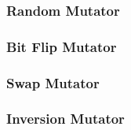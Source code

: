   \subsubsection{Random Mutator}
  \label{sec:keen:operators:mutation:simple}
  \Blindtext

  \subsubsection{Bit Flip Mutator}
  \label{sec:keen:operators:mutation:bit_flip}
  \Blindtext

  \subsubsection{Swap Mutator}
  \label{sec:keen:operators:mutation:swap}
  \Blindtext

  \subsubsection{Inversion Mutator}
  \label{sec:keen:operators:mutation:inversion}
  \Blindtext
